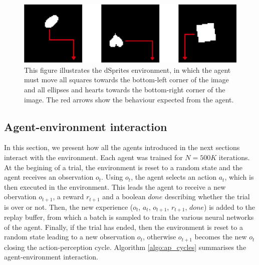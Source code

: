 \documentclass[twoside,11pt]{article}
\begin{document}
\begin{figure}[h]
	\begin{center}
	\includegraphics[scale=0.4]{dSprites_env}
	\end{center}
  \caption{This figure illustrates the dSprites environment, in which the agent must move all squares towards the bottom-left corner of the image and all ellipses and hearts towards the bottom-right corner of the image. The red arrows show the behaviour expected from the agent.}
   \label{fig:dSprites_env}
\end{figure}

\subsection{Agent-environment interaction} \label{ssec:env_agent_iter}

In this section, we present how all the agents introduced in the next sections interact with the environment. Each agent was trained for $N = 500K$ iterations. At the begining of a trial, the environment is reset to a random state and the agent receives an observation $o_t$. Using $o_t$, the agent selects an action $a_t$, which is then executed in the environment. This leads the agent to receive a new obervation $o_{t+1}$, a reward $r_{t+1}$ and a boolean $done$ describing whether the trial is over or not. Then, the new experience ($o_t$, $a_t$, $o_{t+1}$, $r_{t+1}$, $done$) is added to the replay buffer, from which a batch is sampled to train the various neural networks of the agent. Finally, if the trial has ended, then the environment is reset to a random state leading to a new observation $o_t$, otherwise $o_{t+1}$ becomes the new $o_t$ closing the action-perception cycle. Algorithm \ref{algo:ap_cycles} summarises the agent-environment interaction.
\end{document}
